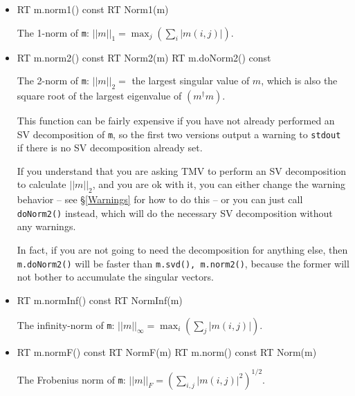 \documentclass[twoside,letterpaper,11pt]{article}
\renewcommand{\tt}[1]{{\lstinline {#1}}}
\begin{document}
\begin{itemize}

\item
\begin{tmvcode}
RT m.norm1() const
RT Norm1(m)
\end{tmvcode}
The 1-norm of \tt{m}: 
$||m||_1 = \max_j (\sum_i |m(i,j)|)$.

\item
\begin{tmvcode}
RT m.norm2() const
RT Norm2(m)
RT m.doNorm2() const
\end{tmvcode}
The 2-norm of \tt{m}: $||m||_2 =$ the largest singular value of $m$, which
is also the square root of the largest eigenvalue of $(m^\dagger m)$.

This function can be fairly expensive if you have not
already performed an SV decomposition of \tt{m}, so the first two versions
output a warning to \tt{stdout} if there is no SV decomposition already set.

If you understand that you are asking TMV to perform an SV decomposition
to calculate $||m||_2$, and you are ok with it, you can either change the warning
behavior -- see \S\ref{Warnings} for how to do this --
or you can just call \tt{doNorm2()} instead, which will do the 
necessary SV decomposition without any warnings.

In fact, if you are not going to need the decomposition for anything else,
then \tt{m.doNorm2()} will be faster than \tt{m.svd(), m.norm2()}, because the 
former will not bother to accumulate the singular vectors.

\item
\begin{tmvcode}
RT m.normInf() const
RT NormInf(m)
\end{tmvcode}
The infinity-norm of \tt{m}: 
$||m||_\infty = \max_i (\sum_j |m(i,j)|)$.

\item
\begin{tmvcode}
RT m.normF() const
RT NormF(m)
RT m.norm() const
RT Norm(m)
\end{tmvcode}
The Frobenius norm of \tt{m}: 
$||m||_F = (\sum_{i,j} |m(i,j)|^2)^{1/2}$.


\end{itemize}
\end{document}
